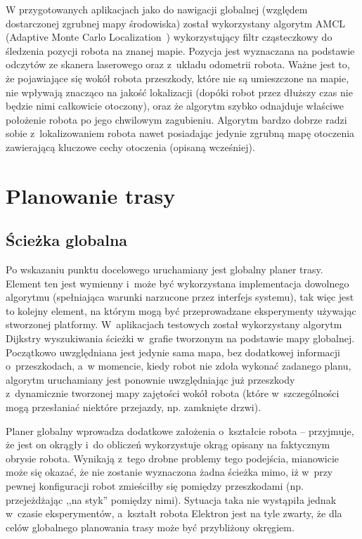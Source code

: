 W przygotowanych aplikacjach jako do nawigacji globalnej (względem dostarczonej
zgrubnej mapy środowiska) został wykorzystany algorytm AMCL (Adaptive Monte Carlo
Localization~\cite{fox2001kld}) wykorzystujący filtr cząsteczkowy do śledzenia
pozycji robota na znanej mapie. Pozycja jest wyznaczana na podstawie odczytów
ze skanera laserowego oraz z~układu odometrii robota. Ważne jest to, że pojawiające
się wokół robota przeszkody, które nie są umieszczone na mapie, nie wpływają znacząco
na jakość lokalizacji (dopóki robot przez dłuższy czas nie będzie nimi całkowicie
otoczony), oraz że algorytm szybko odnajduje właściwe położenie robota po jego
chwilowym zagubieniu. Algorytm bardzo dobrze radzi sobie z~lokalizowaniem robota nawet
posiadając jedynie zgrubną mapę otoczenia zawierającą kluczowe cechy otoczenia
(opisaną wcześniej).

\section{Planowanie trasy}

\subsection{Ścieżka globalna}

Po wskazaniu punktu docelowego uruchamiany jest globalny planer trasy. Element ten
jest wymienny i~może być wykorzystana implementacja dowolnego algorytmu (spełniająca
warunki narzucone przez interfejs systemu), tak więc jest to kolejny element, na którym
mogą być przeprowadzane eksperymenty używając stworzonej platformy. W~aplikacjach
testowych został wykorzystany algorytm Dijkstry wyszukiwania ścieżki w~grafie tworzonym
na podstawie mapy globalnej. Początkowo uwzględniana jest jedynie sama mapa, bez
dodatkowej informacji o~przeszkodach, a~w momencie, kiedy robot nie zdoła wykonać
zadanego planu, algorytm uruchamiany jest ponownie uwzględniając już przeszkody
z~dynamicznie tworzonej mapy zajętości wokół robota (które w~szczególności mogą
przesłaniać niektóre przejazdy, np. zamknięte drzwi).

Planer globalny wprowadza dodatkowe założenia o~kształcie robota -- przyjmuje, że
jest on okrągły i~do obliczeń wykorzystuje okrąg opisany na faktycznym obrysie robota.
Wynikają z~tego drobne problemy tego podejścia, mianowicie może się okazać, że nie
zostanie wyznaczona żadna ścieżka mimo, iż w~przy pewnej konfiguracji robot zmieściłby
się pomiędzy przeszkodami (np. przejeżdżając ,,na styk'' pomiędzy nimi). Sytuacja
taka nie wystąpiła jednak w~czasie eksperymentów, a~kształt robota Elektron jest
na tyle zwarty, że dla celów globalnego planowania trasy może być przybliżony okręgiem.

